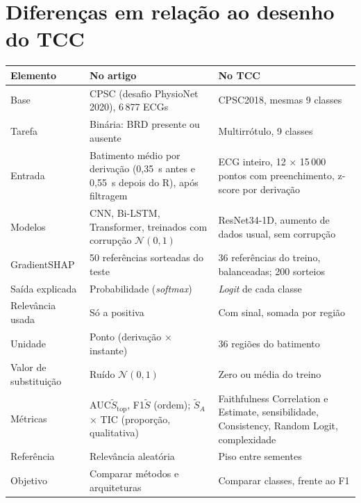 \documentclass[11pt,a4paper]{article}
\begin{document}
\section{Diferenças em relação ao desenho do TCC}
\begin{center}\small
\begin{tabularx}{\linewidth}{lXX}
\toprule
\textbf{Elemento} & \textbf{No artigo} & \textbf{No TCC} \\
\midrule
Base & CPSC (desafio PhysioNet 2020), 6\,877 ECGs & CPSC2018, mesmas 9 classes \\ \addlinespace
Tarefa & Binária: BRD presente ou ausente & Multirrótulo, 9 classes \\ \addlinespace
Entrada & Batimento médio por derivação (0,35~s antes e 0,55~s depois do R), após filtragem & ECG inteiro, 12 × 15\,000 pontos com preenchimento, z-score por derivação \\ \addlinespace
Modelos & CNN, Bi-LSTM, Transformer, treinados com corrupção $\mathcal{N}(0,1)$ & ResNet34-1D, aumento de dados usual, sem corrupção \\ \addlinespace
GradientSHAP & 50 referências sorteadas do teste & 36 referências do treino, balanceadas; 200 sorteios \\ \addlinespace
Saída explicada & Probabilidade (\textit{softmax}) & \textit{Logit} de cada classe \\ \addlinespace
Relevância usada & Só a positiva & Com sinal, somada por região \\ \addlinespace
Unidade & Ponto (derivação × instante) & 36 regiões do batimento \\ \addlinespace
Valor de substituição & Ruído $\mathcal{N}(0,1)$ & Zero ou média do treino \\ \addlinespace
Métricas & AUC$\tilde{S}_{\text{top}}$, F1$\tilde{S}$ (ordem); $\tilde{S}_A$ × TIC (proporção, qualitativa) & Faithfulness Correlation e Estimate, sensibilidade, Consistency, Random Logit, complexidade \\ \addlinespace
Referência & Relevância aleatória & Piso entre sementes \\ \addlinespace
Objetivo & Comparar métodos e arquiteturas & Comparar classes, frente ao F1 \\
\bottomrule
\end{tabularx}
\end{center}
\end{document}
